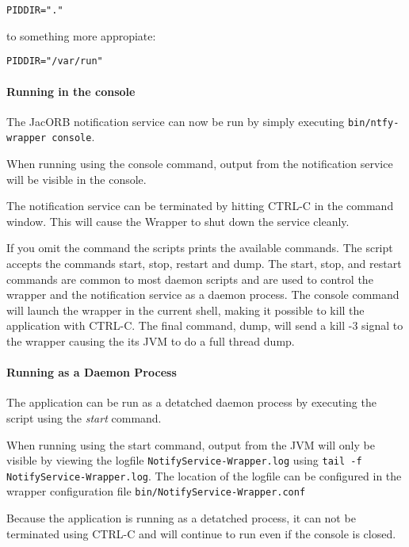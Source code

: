 \begin{verbatim}
PIDDIR="."
\end{verbatim}
to something more appropiate:
\begin{verbatim}
PIDDIR="/var/run"
\end{verbatim}


\paragraph{Running in the console}
\label{sec:running-console}

 The JacORB notification service  can now be run by simply executing
 \texttt{bin/ntfy-wrapper console}.

 When running using the console command, output from the notification
 service will be visible in the console. 

 The notification service can be terminated by hitting CTRL-C in the command
 window. This will cause the Wrapper to shut down the service cleanly.  

 If you omit the command the scripts prints the available commands.
 The script accepts the commands start, stop, restart and dump. The
 start, stop, and restart commands are common to most daemon scripts
 and are used to control the wrapper and the notification service  as
 a daemon process. The console 
 command will launch the wrapper in the current shell, making it
 possible to kill the application with CTRL-C. The final command,
 dump, will send a kill -3 signal to the wrapper causing the its JVM
 to do a full thread dump.  
 
 \paragraph{Running as a Daemon Process}
 \label{sec:running-as-daemon}
 
 The application can be run as a detatched daemon process by executing
 the script using the \emph{start} command. 

 When running using the start  command, output from the JVM will only
 be visible by viewing the logfile \texttt{NotifyService-Wrapper.log}
 using \texttt{tail -f NotifyService-Wrapper.log}. The location of the
 logfile can be configured in the wrapper configuration file
 \texttt{bin/NotifyService-Wrapper.conf} 

 Because the application is running as a detatched process, it can not
 be terminated using CTRL-C and will continue to run even if the
 console is closed. 
 
